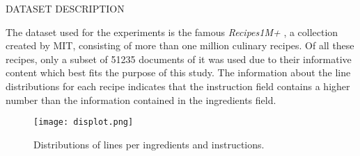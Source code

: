 \begin{frame}{DATASET DESCRIPTION}
    \begin{minipage}{\linewidth}
        \centering
        \begin{minipage}{0.45\linewidth}
            The dataset used for the experiments is the famous \emph{Recipes1M+} \footnotemark, a collection 
            created by MIT, consisting of more than one million culinary recipes. Of 
            all these recipes, only a subset of 51235 documents of it was used due to their 
            informative content which best fits the purpose of this study. The information 
            about the line distributions for each recipe indicates that the instruction 
            field contains a higher number than the information contained in the ingredients 
            field.
        \end{minipage}
        \hspace{0.05\linewidth}
        \begin{minipage}{0.47\linewidth}
            \begin{figure}[h!]
                \centering
                \texttt{[image: displot.png]}
                \centering
                \caption{Distributions of lines per ingredients and instructions.}
                \label{distributions}
            \end{figure}
        \end{minipage}
    \end{minipage}
\end{frame}

